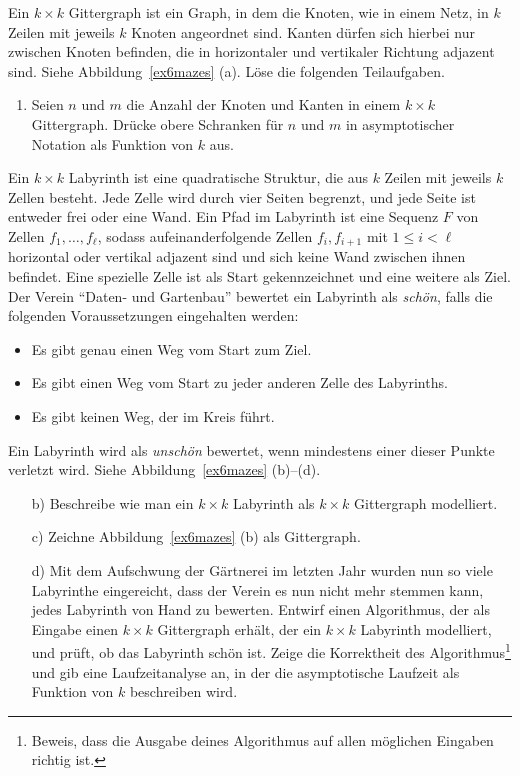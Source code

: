 \documentclass{uebung_cs}
\begin{document}
\begin{aufgabe}
	Ein $k\times k$ Gittergraph ist ein Graph, in dem die Knoten, wie in einem Netz, in $k$ Zeilen mit jeweils $k$ Knoten angeordnet sind.
	Kanten dürfen sich hierbei nur zwischen Knoten befinden, die in horizontaler und vertikaler Richtung adjazent sind.
	Siehe Abbildung~\ref{ex6mazes} (a).
	Löse die folgenden Teilaufgaben.
	\begin{enumerate}
		\item Seien $n$ und $m$ die Anzahl der Knoten und Kanten in einem $k\times k$ Gittergraph.
		Drücke obere Schranken für $n$ und $m$ in asymptotischer Notation als Funktion von $k$ aus.
	\end{enumerate}
	Ein $k\times k$ Labyrinth ist eine quadratische Struktur, die aus $k$ Zeilen mit jeweils $k$ Zellen besteht.
	Jede Zelle wird durch vier Seiten begrenzt, und jede Seite ist entweder frei oder eine Wand.
	Ein Pfad im Labyrinth ist eine Sequenz $F$ von Zellen $f_1,\ldots, f_\ell$, sodass aufeinanderfolgende Zellen $f_i, f_{i+1}$ mit $1 \leq i < \ell$ horizontal oder vertikal adjazent sind und sich keine Wand zwischen ihnen befindet.
	Eine spezielle Zelle ist als Start gekennzeichnet und eine weitere als Ziel.\\
	Der Verein \enquote{Daten- und Gartenbau} bewertet ein Labyrinth als \textit{schön}, falls die folgenden Voraussetzungen eingehalten werden:
	\begin{itemize}
		\item Es gibt genau einen Weg vom Start zum Ziel.
		\item Es gibt einen Weg vom Start zu jeder anderen Zelle des Labyrinths.
		\item Es gibt keinen Weg, der im Kreis führt.
	\end{itemize}
	Ein Labyrinth wird als \textit{unschön} bewertet, wenn mindestens einer dieser Punkte verletzt wird.
	Siehe Abbildung~\ref{ex6mazes} (b)--(d).
	\begin{enumerate}
		\item[b)] Beschreibe wie man ein $k\times k$ Labyrinth als $k\times k$ Gittergraph modelliert.
		\item[c)] Zeichne Abbildung~\ref{ex6mazes} (b) als Gittergraph.
		\item[d)] Mit dem Aufschwung der Gärtnerei im letzten Jahr wurden nun so viele Labyrinthe eingereicht, dass der Verein es nun nicht mehr stemmen kann, jedes Labyrinth von Hand zu bewerten.
		Entwirf einen Algorithmus, der als Eingabe einen $k\times k$ Gittergraph erhält, der ein $k\times k$ Labyrinth modelliert, und prüft, ob das Labyrinth schön ist.
		Zeige die Korrektheit des Algorithmus\footnote{Beweis, dass die Ausgabe deines Algorithmus auf allen möglichen Eingaben richtig ist.} und gib eine Laufzeitanalyse an, in der die asymptotische Laufzeit als Funktion von $k$ beschreiben wird.
	\end{enumerate}
\end{aufgabe}
\end{document}
